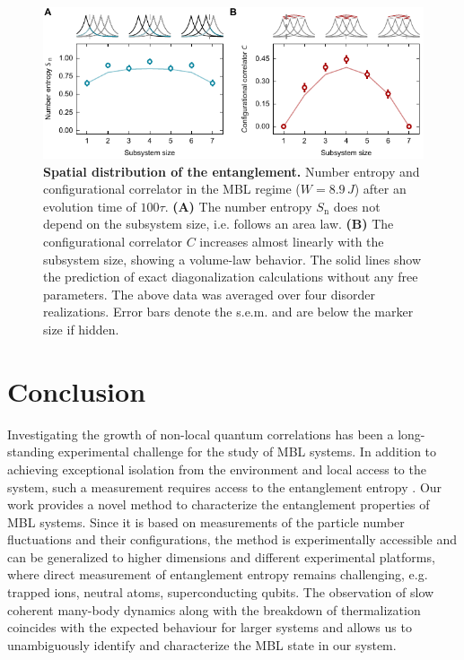 \begin{figure}[t]
	\centering
	\includegraphics{figures/MBL_scaling.pdf}
	\caption{{\bf Spatial distribution of the entanglement.} Number entropy and configurational correlator in the MBL regime ($W=8.9\,J$) after an evolution time of $100\tau$. {\bf (A)} The number entropy $S_\text{n}$ does not depend on the subsystem size, i.e. follows an area law. {\bf (B)} The configurational correlator $C$ increases almost linearly with the subsystem size, showing a volume-law behavior. The solid lines show the prediction of exact diagonalization calculations without any free parameters. The above data was averaged over four disorder realizations. Error bars denote the s.e.m. and are below the marker size if hidden.}
	\label{fig:MBL_scalings}
\end{figure}

\section{Conclusion}

Investigating the growth of non-local quantum correlations has been a long-standing experimental challenge for the study of MBL systems. In addition to achieving exceptional isolation from the environment and local access to the system, such a measurement requires access to the entanglement entropy \cite{Islam2015}. Our work provides a novel method to characterize the entanglement properties of MBL systems. Since it is based on measurements of the particle number fluctuations and their configurations, the method is experimentally accessible and can be generalized to higher dimensions and different experimental platforms, where direct measurement of entanglement entropy remains challenging, e.g. trapped ions, neutral atoms, superconducting qubits. The observation of slow coherent many-body dynamics along with the breakdown of thermalization coincides with the expected behaviour for larger systems and allows us to unambiguously identify and characterize the MBL state in our system.


